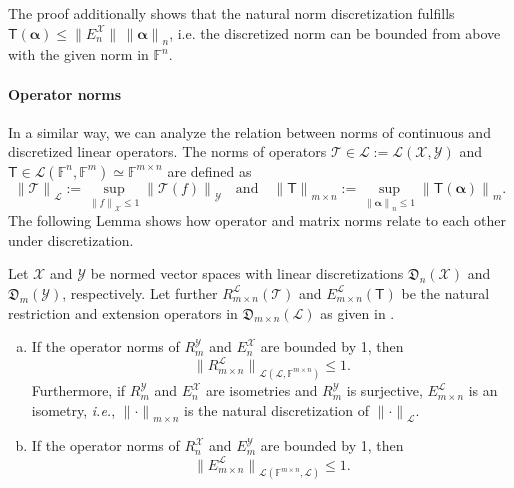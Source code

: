 \documentclass[a4paper]{paper}
\newcommand{\Discr}{\mathfrak{D}}
\newcommand{\Spc}[1]{\mathscr{#1}}
\newcommand{\Field}{\mathbb{F}}
\newcommand{\Op}[1]{\mathcal{#1}}
\newcommand{\DiscOp}[1]{\mathsf{#1}}
\newcommand*{\EXT}[2]{\ensuremath{E_{#1}^{#2}}}
\newcommand*{\REST}[2]{\ensuremath{R_{#1}^{#2}}}
\newcommand*{\RnX}{\ensuremath{\REST{n}{\Spc{X}}}}
\newcommand*{\RmY}{\ensuremath{\REST{m}{\Spc{Y}}}}
\newcommand*{\EnX}{\ensuremath{\EXT{n}{\Spc{X}}}}
\newcommand*{\EmY}{\ensuremath{\EXT{m}{\Spc{Y}}}}
\newcommand*{\NORM}[1]{\ensuremath{\lVert #1 \rVert}}
\newcommand{\ie}{\textsl{i.e.}\xspace}
\newcommand{\valpha}{\boldsymbol{\alpha}}
\begin{document}
\begin{remark}
 The proof additionally shows that the natural norm discretization fulfills
 $\DiscOp{T}(\valpha) \leq \NORM{\EnX}\, \NORM{\valpha}_n$, i.e. the discretized norm can be bounded from above 
 with the given norm in $\Field^n$.
\end{remark}


\paragraph{Operator norms}

In a similar way, we can analyze the relation between norms of continuous and discretized linear operators. 
The norms of operators $\Op{T} \in \Spc{L} := \Spc{L}(\Spc{X}, \Spc{Y})$ and 
$\DiscOp{T} \in \Spc{L}(\Field^n, \Field^m) \simeq \Field^{m\times n}$ are defined as
%
\begin{equation*}
 \NORM{\Op{T}}_{\Spc{L}} := \sup_{\NORM{f}_{\Spc{X}} \leq 1} \NORM{\Op{T}(f)}_{\Spc{Y}}
 \quad \text{and} \quad
 \NORM{\DiscOp{T}}_{m\times n} := \sup_{\NORM{\valpha}_n \leq 1} \NORM{\DiscOp{T}(\valpha)}_m.
\end{equation*}
%
The following Lemma shows how operator and matrix norms relate to each other under discretization.


\begin{lemma}
 \label{lemma:prop:norm:op_norm_est}
 Let $\Spc{X}$ and $\Spc{Y}$ be normed vector spaces with linear discretizations $\Discr_n(\Spc{X})$ and 
 $\Discr_m(\Spc{Y})$, respectively. Let further $\REST{m\times n}{\Spc{L}}(\Op{T})$ and 
 $\EXT{m\times n}{\Spc{L}}(\DiscOp{T})$ be the natural restriction and extension operators in 
 $\Discr_{m\times n}(\Spc{L})$ as given in .
 \begin{enumerate}[(a)]
  \item \label{lemma:prop:norm:op_norm_est:a_rest}
  If the operator norms of $\RmY$ and $\EnX$ are bounded by 1, then
  \begin{equation*}
   \NORM{R_{m\times n}^{\Spc{L}}}_{\Spc{L}(\Spc{L},\Field^{m\times n})} \leq 1.
  \end{equation*}
  Furthermore, if $\RmY$ and $\EnX$ are isometries and $\RmY$ is surjective, $\EXT{m\times n}{\Spc{L}}$ is an 
  isometry, \ie, $\NORM{\cdot}_{m\times n}$ is the natural discretization of $\NORM{\cdot}_{\Spc{L}}$.
  
  \item \label{lemma:prop:norm:op_norm_est:b_ext}
  If the operator norms of $\RnX$ and $\EmY$ are bounded by 1, then
  \begin{equation*}
   \NORM{E_{m\times n}^{\Spc{L}}}_{\Spc{L}(\Field^{m\times n}, \Spc{L})} \leq 1.
  \end{equation*}
 \end{enumerate}
\end{lemma}
\vspace{1em}
\end{document}
